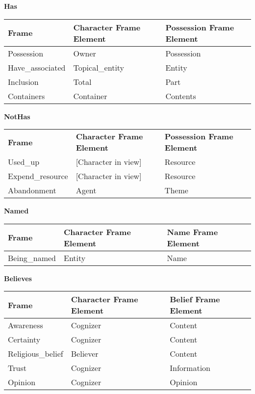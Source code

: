 \textbf{Has} 
\begin{table}[!htbp]
    \begin{tabular}{|l|l|l|}
    \hline
    \textbf{Frame}           & \textbf{Character Frame Element} & \textbf{Possession Frame Element} \\ \hline
    Possession      & Owner                   & Possession               \\ \hline
    Have\_associated & Topical\_entity         & Entity                   \\ \hline
    Inclusion       & Total                   & Part                     \\ \hline
    Containers      & Container               & Contents                 \\ \hline
    \end{tabular}
\end{table}

\textbf{NotHas} 
\begin{table}[!htbp]
    \begin{tabular}{lll}
    \textbf{Frame}           & \textbf{Character Frame Element} & \textbf{Possession Frame Element} \\
    Used\_up        & [Character in view]     & Resource                 \\
    Expend\_resource & [Character in view]     & Resource                 \\
    Abandonment     & Agent                   & Theme                    \\
    \end{tabular}
\end{table}

\textbf{Named} 
\begin{table}[!htbp]
    \begin{tabular}{|l|l|l|}
    \hline
    \textbf{Frame}       & \textbf{Character Frame Element} & \textbf{Name Frame Element} \\ \hline
    Being\_named & Entity                  & Name               \\ \hline
    \end{tabular}
\end{table} 

\textbf{Believes} 
\begin{table}[!htbp]
    \begin{tabular}{|l|l|l|}
    \hline
    \textbf{Frame}            & \textbf{Character Frame Element} & \textbf{Belief Frame Element} \\ \hline
    Awareness        & Cognizer                & Content              \\ \hline
    Certainty        & Cognizer                & Content              \\ \hline
    Religious\_belief & Believer                & Content              \\ \hline
    Trust            & Cognizer                & Information          \\ \hline
    Opinion          & Cognizer                & Opinion              \\ \hline
    \end{tabular}
\end{table}

